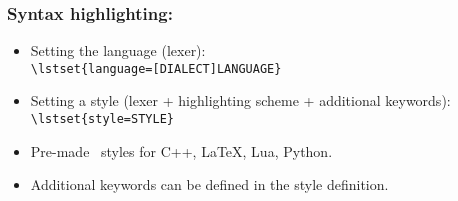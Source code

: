		\subsubsection{Syntax highlighting:}
			\vspace{-0.25cm}
			\begin{itemize}
				\setlength\itemsep{-0.125em}
				\item Setting the language (lexer):\\
				\lstinline$\lstset{language=[DIALECT]LANGUAGE}$
				\item Setting a style (lexer + highlighting scheme + additional keywords):\\
				\lstinline$\lstset{style=STYLE}$
				\item Pre-made \productName~styles for C++, \LaTeX, Lua, Python. 
				\item Additional keywords can be defined in the style definition.
			\end{itemize}
		